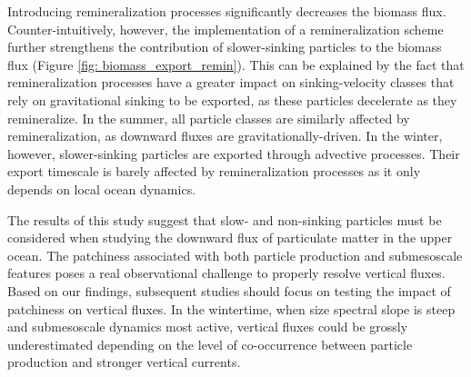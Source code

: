 \documentclass[article,linenumbers]{agujournal2018}
\begin{document}
Introducing remineralization processes significantly decreases the biomass flux. Counter-intuitively, however, the implementation of a remineralization scheme further strengthens the contribution of slower-sinking particles to the biomass flux (Figure \ref{fig: biomass_export_remin}). This can be explained by the fact that remineralization processes have a greater impact on sinking-velocity classes that rely on gravitational sinking to be exported, as these particles decelerate as they remineralize. In the summer, all particle classes are similarly affected by remineralization, as downward fluxes are gravitationally-driven. In the winter, however, slower-sinking particles are exported through advective processes. Their export timescale is barely affected by remineralization processes as it only depends on local ocean dynamics.

The results of this study suggest that slow- and non-sinking particles must be considered when studying the downward flux of particulate matter in the upper ocean. The patchiness associated with both particle production and submesoscale features poses a real observational challenge to properly resolve vertical fluxes. Based on our findings, subsequent studies should focus on testing the impact of patchiness on vertical fluxes. In the wintertime, when size spectral slope is steep and submesoscale dynamics most active, vertical fluxes could be grossly underestimated depending on the level of co-occurrence between particle production and stronger vertical currents.
\end{document}
